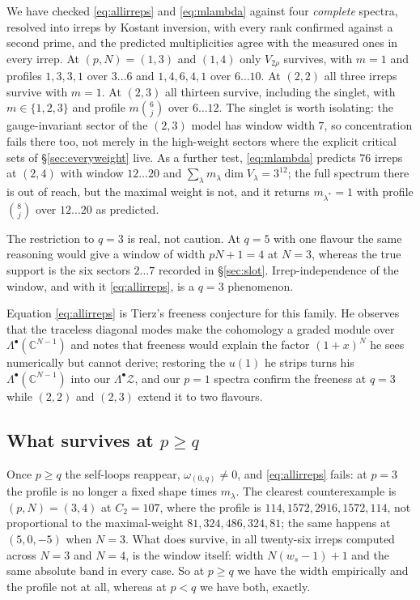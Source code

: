 \documentclass[10pt]{article}
\begin{document}
We have checked \eqref{eq:allirreps} and \eqref{eq:mlambda} against four \emph{complete} spectra, resolved into
irreps by Kostant inversion, with every rank confirmed against a second prime, and the predicted multiplicities
agree with the measured ones in every irrep. At $(p,N)=(1,3)$ and $(1,4)$ only $V_{2\rho}$ survives, with $m=1$
and profiles $1,3,3,1$ over $3\ldots6$ and $1,4,6,4,1$ over $6\ldots10$. At $(2,2)$ all three irreps survive
with $m=1$. At $(2,3)$ all thirteen survive, including the singlet, with $m\in\{1,2,3\}$ and profile
$m\binom6j$ over $6\ldots12$. The singlet is worth isolating: the gauge-invariant sector of the $(2,3)$ model
has window width $7$, so concentration fails there too, not merely in the high-weight sectors where the explicit
critical sets of \S\ref{sec:everyweight} live. As a further test, \eqref{eq:mlambda} predicts $76$ irreps at
$(2,4)$ with window $12\ldots20$ and $\sum_\lambda m_\lambda\dim V_\lambda=3^{12}$; the full spectrum there is
out of reach, but the maximal weight is not, and it returns $m_{\lambda^*}=1$ with profile $\binom8j$ over
$12\ldots20$ as predicted.

The restriction to $q=3$ is real, not caution. At $q=5$ with one flavour the same reasoning would give a window
of width $pN+1=4$ at $N=3$, whereas the true support is the six sectors $2\ldots7$ recorded in
\S\ref{sec:slot}. Irrep-independence of the window, and with it \eqref{eq:allirreps}, is a $q=3$ phenomenon.

Equation \eqref{eq:allirreps} is Tierz's freeness conjecture for this family. He observes that the traceless
diagonal modes make the cohomology a graded module over $\Lambda^\bullet(\mathbb C^{N-1})$ and notes that
freeness would explain the factor $(1+x)^N$ he sees numerically but cannot derive; restoring the $u(1)$ he
strips turns his $\Lambda^\bullet(\mathbb C^{N-1})$ into our $\Lambda^\bullet\mathcal Z$, and our $p=1$ spectra
confirm the freeness at $q=3$ while $(2,2)$ and $(2,3)$ extend it to two flavours.

\subsection{What survives at $p\ge q$}

Once $p\ge q$ the self-loops reappear, $\omega_{(0,q)}\ne0$, and \eqref{eq:allirreps} fails: at $p=3$ the profile
is no longer a fixed shape times $m_\lambda$. The clearest counterexample is $(p,N)=(3,4)$ at $C_2=107$, where
the profile is $114,1572,2916,1572,114$, not proportional to the maximal-weight $81,324,486,324,81$; the same
happens at $(5,0,-5)$ when $N=3$. What does survive, in all twenty-six irreps computed across $N=3$ and $N=4$,
is the window itself: width $N(w_s-1)+1$ and the same absolute band in every case. So at $p\ge q$ we have the
width empirically and the profile not at all, whereas at $p<q$ we have both, exactly.
\end{document}
